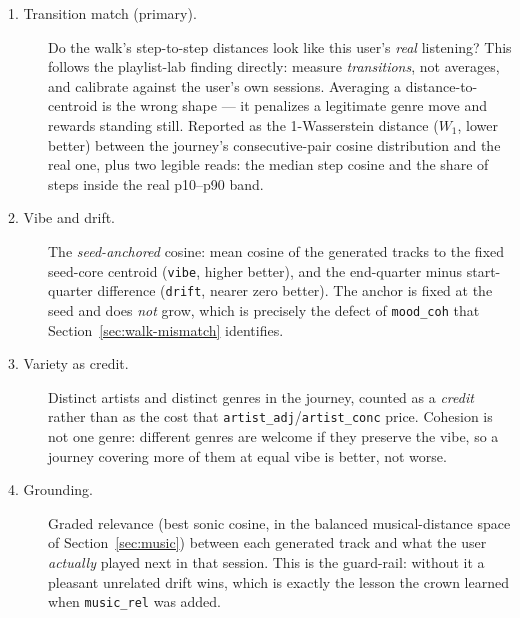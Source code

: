 \documentclass[11pt]{article}
\begin{document}
\begin{description}
  \item[1. Transition match (primary).] Do the walk's step-to-step distances
  look like this user's \emph{real} listening? This follows the playlist-lab
  finding directly: measure \emph{transitions}, not averages, and calibrate
  against the user's own sessions. Averaging a distance-to-centroid is the wrong
  shape --- it penalizes a legitimate genre move and rewards standing still.
  Reported as the 1-Wasserstein distance ($W_1$, lower better) between the
  journey's consecutive-pair cosine distribution and the real one, plus two
  legible reads: the median step cosine and the share of steps inside the real
  p10--p90 band.
  \item[2. Vibe and drift.] The \emph{seed-anchored} cosine: mean cosine of the
  generated tracks to the fixed seed-core centroid (\texttt{vibe}, higher
  better), and the end-quarter minus start-quarter difference (\texttt{drift},
  nearer zero better). The anchor is fixed at the seed and does \emph{not} grow,
  which is precisely the defect of \texttt{mood\_coh} that
  Section~\ref{sec:walk-mismatch} identifies.
  \item[3. Variety as credit.] Distinct artists and distinct genres in the
  journey, counted as a \emph{credit} rather than as the cost that
  \texttt{artist\_adj}/\texttt{artist\_conc} price. Cohesion is not one genre:
  different genres are welcome if they preserve the vibe, so a journey covering
  more of them at equal vibe is better, not worse.
  \item[4. Grounding.] Graded relevance (best sonic cosine, in the balanced
  musical-distance space of Section~\ref{sec:music}) between each generated
  track and what the user \emph{actually} played next in that session. This is
  the guard-rail: without it a pleasant unrelated drift wins, which is exactly
  the lesson the crown learned when \texttt{music\_rel} was added.
\end{description}
\end{document}
